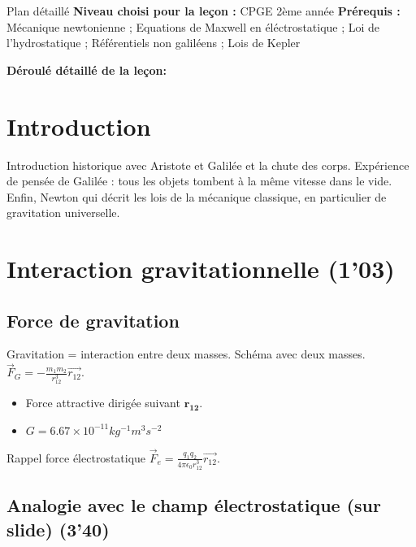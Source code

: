 \begin{reportBlock}{Plan détaillé}
  \textbf{Niveau choisi pour la leçon :} CPGE 2ème année
  \newline
  \textbf{Prérequis : }Mécanique newtonienne ; Equations de Maxwell en éléctrostatique ; Loi de l'hydrostatique ; Référentiels non galiléens ; Lois de Kepler
  \newline
  
  \textbf{Déroulé détaillé de la leçon: }   \newline
  
  \section*{Introduction}

Introduction historique avec Aristote et Galilée et la chute des corps. Expérience de pensée de Galilée : tous les objets tombent à la même vitesse dans le vide. Enfin, Newton qui décrit les lois de la mécanique classique, en particulier de gravitation universelle.


\section{Interaction gravitationnelle (1'03)}

\subsection{Force de gravitation}

Gravitation = interaction entre deux masses. Schéma avec deux masses. $\overrightarrow{F}_G = - \frac{m_1 m_2}{r_{12}^3} \overrightarrow{r_{12}}$. \\
\begin{itemize}
\item Force attractive dirigée suivant $\mathbf{r_{12}}$.
\item $G = 6.67\times10^{-11} kg^{-1} m^3 s^{-2}$
\end{itemize}

Rappel force électrostatique $\overrightarrow{F}_e = \frac{q_1 q_2}{4\pi \epsilon_0 r_{12}^3} \overrightarrow{r_{12}}$.


\subsection{Analogie avec le champ électrostatique (sur slide) (3'40)}


\end{reportBlock}

